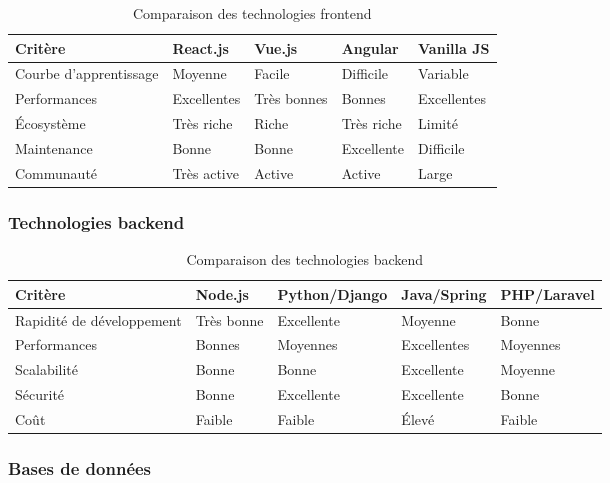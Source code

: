 \begin{table}[H]
\centering
\caption{Comparaison des technologies frontend}
\begin{tabular}{|l|p{3cm}|p{3cm}|p{3cm}|p{3cm}|}
\hline
\textbf{Critère} & \textbf{React.js} & \textbf{Vue.js} & \textbf{Angular} & \textbf{Vanilla JS} \\
\hline
Courbe d'apprentissage & Moyenne & Facile & Difficile & Variable \\
Performances & Excellentes & Très bonnes & Bonnes & Excellentes \\
Écosystème & Très riche & Riche & Très riche & Limité \\
Maintenance & Bonne & Bonne & Excellente & Difficile \\
Communauté & Très active & Active & Active & Large \\
\hline
\end{tabular}
\end{table}

\subsubsection{Technologies backend}

\begin{table}[H]
\centering
\caption{Comparaison des technologies backend}
\begin{tabular}{|l|p{3cm}|p{3cm}|p{3cm}|p{3cm}|}
\hline
\textbf{Critère} & \textbf{Node.js} & \textbf{Python/Django} & \textbf{Java/Spring} & \textbf{PHP/Laravel} \\
\hline
Rapidité de développement & Très bonne & Excellente & Moyenne & Bonne \\
Performances & Bonnes & Moyennes & Excellentes & Moyennes \\
Scalabilité & Bonne & Bonne & Excellente & Moyenne \\
Sécurité & Bonne & Excellente & Excellente & Bonne \\
Coût & Faible & Faible & Élevé & Faible \\
\hline
\end{tabular}
\end{table}

\subsubsection{Bases de données}

